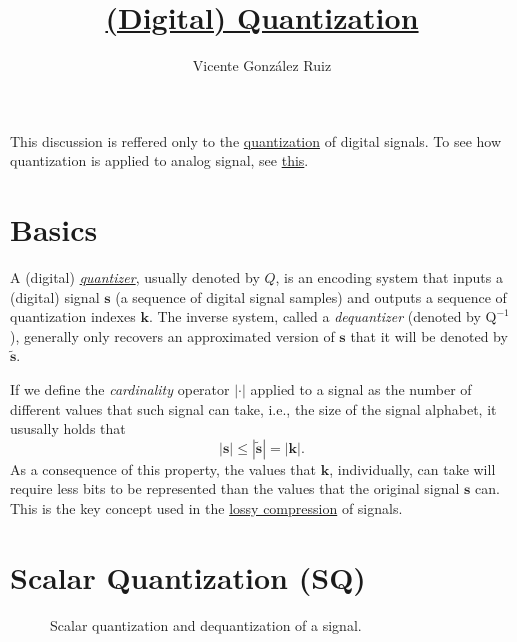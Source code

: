 
\title{\href{https://github.com/vicente-gonzalez-ruiz/quantization}{(Digital) Quantization}}

\author{Vicente González Ruiz}

\maketitle
\tableofcontents

This discussion is reffered only to the
\href{https://en.wikipedia.org/wiki/Quantization_(signal_processing)}{quantization}
of digital signals. To see how quantization is applied to analog
signal, see
\href{https://vicente-gonzalez-ruiz.github.io/analog_quantization/}{this}.

\section{Basics}

A (digital)
\href{https://en.wikipedia.org/wiki/Quantization_(signal_processing)}{\emph{quantizer}},
usually denoted by $Q$, is an encoding system that inputs a (digital)
signal $\mathbf{s}$ (a sequence of digital signal samples) and outputs
a sequence of quantization indexes ${\mathbf k}$. The inverse system,
called a \emph{dequantizer} (denoted by $\text{Q}^{-1}$), generally
only recovers an approximated version of ${\mathbf s}$ that it will be
denoted by $\tilde{{\mathbf s}}$.

If we define the \emph{cardinality} operator $|\cdot|$ applied to a
signal as the number of different values that such signal can take,
i.e., the size of the signal alphabet, it ususally holds that
\begin{equation}
  |{\mathbf s}|\leq|\tilde{\mathbf s}| = |{\mathbf k}|.
\end{equation}
As a consequence of this property, the values that ${\mathbf k}$, individually,
can take will require less bits to be represented than the values that
the original signal ${\mathbf s}$ can. This is the key concept used in
the \href{https://en.wikipedia.org/wiki/Lossy_compression}{lossy
  compression} of signals.


\section{Scalar Quantization (SQ)}

\begin{figure}
  \centering {}
  \caption{Scalar quantization and dequantization of a signal.}
  \label{fig:Q}
\end{figure}


